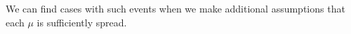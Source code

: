 \documentclass[a4paper,final]{article}
\newtheorem{theorem}{Theorem}[section]
\newtheorem{proposition}[theorem]{Proposition}
\renewcommand\P{\mathbb{P}} %
\newcommand\EU{\mathrm{EU}}
\newcommand\EAd{\mathrm{EAd}}
\newcommand{\Decs}{\mathcal{D}}
\newcommand\s{\mathsf{s}}
\newcommand{\IB}{\mathbb{B}}
\newcommand{\IP}{\P}
\newcommand\SetDelimiter[1][]{
	\nonscript\,#1\vert \allowbreak \nonscript\,\mathopen{}}
\providecommand\given{\SetDelimiter}
\renewcommand{\emptyset}{\varnothing}
\newenvironment{CCM rewritten}
{\begingroup\color{blue}} %
{\endgroup}              %
\begin{document}
%

%		
%	
%


We can find cases with such events when we make additional assumptions that each $\mu$ is sufficiently spread. %
\end{document}
